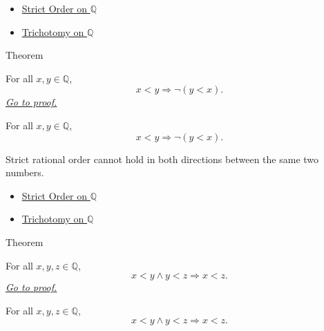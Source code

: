 \begin{dependencies}
\begin{itemize}
  \item \hyperref[def:strict-order-on-q]{Strict Order on $\mathbb{Q}$}
  \item \hyperref[thm:trichotomy-on-q]{Trichotomy on $\mathbb{Q}$}
\end{itemize}
\end{dependencies}

\begin{theorembox}{Theorem}
\begin{theorem}
\label{thm:strict-order-on-q-asymmetric}
For all $x,y\in\mathbb{Q}$,
\[
x<y \Longrightarrow \neg(y<x).
\]
\hyperref[prf:strict-order-on-q-asymmetric]{\textit{Go to proof.}}
\end{theorem}
\end{theorembox}

\begin{remark*}
For all $x,y\in\mathbb{Q}$,
\[
x<y\Longrightarrow \neg(y<x).
\]
\end{remark*}

\begin{remark*}[Interpretation]
Strict rational order cannot hold in both directions between the same two
numbers.
\end{remark*}

\begin{dependencies}
\begin{itemize}
  \item \hyperref[def:strict-order-on-q]{Strict Order on $\mathbb{Q}$}
  \item \hyperref[thm:trichotomy-on-q]{Trichotomy on $\mathbb{Q}$}
\end{itemize}
\end{dependencies}

\begin{theorembox}{Theorem}
\begin{theorem}
\label{thm:strict-order-on-q-transitive}
For all $x,y,z\in\mathbb{Q}$,
\[
x
<y\land y<z \Longrightarrow x<z.
\]
\hyperref[prf:strict-order-on-q-transitive]{\textit{Go to proof.}}
\end{theorem}
\end{theorembox}

\begin{remark*}
For all $x,y,z\in\mathbb{Q}$,
\[
x<y\land y<z\Longrightarrow x<z.
\]
\end{remark*}

